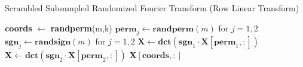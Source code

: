 \begin{algorithm}[ht!] 
\begin{algorithmic}[1]
\caption{Scrambled Subsampled Randomized Fourier Transform (Row Linear Transform)}\label{alg:ssrft}
\State \textbf{coords} $\leftarrow$ \textbf{randperm}(m,k) 
\State $\textbf{perm}_{j} \leftarrow \textbf{randperm}(m)$ for $j = 1,2$
\State $\textbf{sgn}_{j} \leftarrow \textbf{randsign}(m)$ for $j = 1,2$
\State $\mathbf{X} \leftarrow \textbf{dct}(\textbf{sgn}_1 \cdot \mathbf{X}[\textbf{perm}_1,:])$   
\State $\mathbf{X} \leftarrow \textbf{dct}(\textbf{sgn}_2 \cdot \mathbf{X}[\textbf{perm}_2,:])$
\State \Return $\mathbf{X}[\textbf{coords},:]$
\EndFunction
\end{algorithmic}
\end{algorithm}
